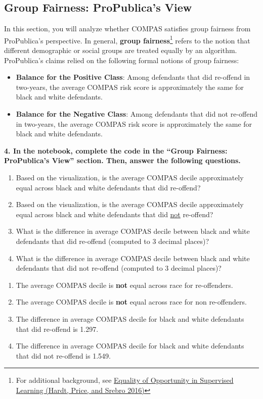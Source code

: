 \documentclass{article}
\begin{document}
\subsection*{Group Fairness: ProPublica's View}

In this section, you will analyze whether COMPAS satisfies group fairness from ProPublica's perspective. In general, \textbf{group fairness}\footnote{For additional background, see \href{https://arxiv.org/pdf/1610.02413}{Equality of Opportunity in Supervised Learning (Hardt, Price, and Srebro 2016)}} refers to the notion that different demographic or social groups are treated equally by an algorithm. ProPublica's claims relied on the following formal notions of group fairness:
\begin{itemize}
    \item \textbf{Balance for the Positive Class}: Among defendants that did re-offend in two-years, the average COMPAS risk score is approximately the same for black and white defendants.
    \item \textbf{Balance for the Negative Class}: Among defendants that did not re-offend in two-years, the average COMPAS risk score is approximately the same for black and white defendants.
\end{itemize}

\textbf{4. In the notebook, complete the code in the ``Group Fairness: ProPublica's View'' section. Then, answer the following questions.}
\begin{enumerate}[label=\Alph*.]
\item Based on the visualization, is the average COMPAS decile approximately equal across black and white defendants that did re-offend?
\item Based on the visualization, is the average COMPAS decile approximately equal across black and white defendants that did \underline{not} re-offend?
\item What is the difference in average COMPAS decile between black and white defendants that did re-offend (computed to 3 decimal places)?
\item What is the difference in average COMPAS decile between black and white defendants that did not re-offend (computed to 3 decimal places)?
\end{enumerate}
\bigskip
\begin{mdframed}
\begin{enumerate}[label=\Alph*.]
\item The average COMPAS decile is \textbf{not} equal across race for re-offenders.
\item The average COMPAS decile is \textbf{not} equal across race for non re-offenders.
\item The difference in average COMPAS decile for black and white defendants that did re-offend is 1.297.
\item The difference in average COMPAS decile for black and white defendants that did not re-offend is 1.549.
\end{enumerate}
\end{mdframed}
\bigskip
\end{document}
